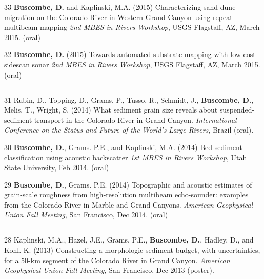 \documentclass[margin,line]{resume}
\begin{document}
\begin{resume}
\begin{footnotesize}
\begin{list1}
        \item[33] {\bf Buscombe, D.} and Kaplinski, M.A. (2015) Characterizing sand dune migration on the Colorado River in Western Grand Canyon using repeat multibeam mapping {\sl 2nd MBES in Rivers Workshop}, USGS Flagstaff, AZ, March 2015. (oral)\\

        \item[32] {\bf Buscombe, D.} (2015) Towards automated substrate mapping with low-cost sidescan sonar {\sl 2nd MBES in Rivers Workshop}, USGS Flagstaff, AZ, March 2015. (oral)
        
	\end{list1}

	\subsection{}
	\begin{list1}
        \item[31] Rubin, D., Topping, D., Grams, P., Tusso, R., Schmidt, J., {\bf Buscombe, D.}, Melis, T., Wright, S. (2014) What sediment grain size reveals about suspended-sediment transport in the Colorado River in Grand Canyon. {\sl International Conference on the Status and Future of the World's Large Rivers}, Brazil (oral).\\

        \item[30] {\bf Buscombe, D.}, Grams. P.E., and Kaplinski, M.A. (2014) Bed sediment classification using acoustic backscatter {\sl 1st MBES in Rivers Workshop}, Utah State University, Feb 2014. (oral)\\

        \item[29] {\bf Buscombe, D.}, Grams. P.E. (2014) Topographic and acoustic estimates of grain-scale roughness from high-resolution multibeam echo-sounder: examples from the Colorado River in Marble and Grand Canyons. {\sl American Geophysical Union Fall Meeting}, San Francisco, Dec 2014. (oral)
	\end{list1}
	
	\subsection{}
	\begin{list1}
	\item[28] Kaplinski, M.A., Hazel, J.E., Grams. P.E., {\bf Buscombe, D.}, Hadley, D., and Kohl. K. (2013) Constructing a morphologic sediment budget, with uncertainties, for a 50-km segment of the Colorado River in Grand Canyon.  {\sl American Geophysical Union Fall Meeting}, San Francisco, Dec 2013 (poster).\\


\end{list1}
\end{footnotesize}
\end{resume}
\end{document}
